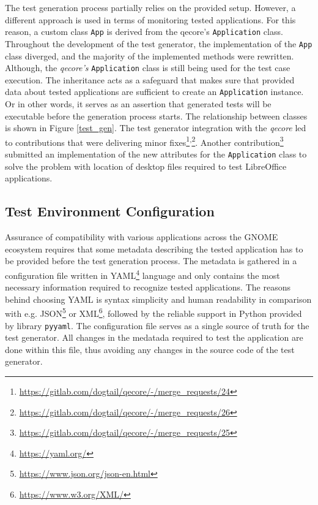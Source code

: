 The test generation process partially relies on the provided setup. However, a different approach is used in terms of monitoring tested applications. For this reason, a custom class \texttt{App} is derived from the qecore's \texttt{Application} class. Throughout the development of the test generator, the implementation of the \texttt{App} class diverged, and the majority of the implemented methods were rewritten. Although, the \textit{qecore's} \texttt{Application} class is still being used for the test case execution. The inheritance acts as a safeguard that makes sure that provided data about tested applications are sufficient to create an \texttt{Application} instance. Or in other words, it serves as an assertion that generated tests will be executable before the generation process starts. The relationship between classes is shown in Figure \ref{test_gen}. The test generator integration with the \textit{qecore} led to contributions that were delivering minor fixes\footnote{\url{https://gitlab.com/dogtail/qecore/-/merge_requests/24}}\textsuperscript{,}\footnote{\url{https://gitlab.com/dogtail/qecore/-/merge_requests/26}}. Another contribution\footnote{\url{https://gitlab.com/dogtail/qecore/-/merge_requests/25}} submitted an implementation of the new attributes for the \texttt{Application} class to solve the problem with location of desktop files required to test LibreOffice applications.

\subsection{Test Environment Configuration}\label{env_config}
Assurance of compatibility with various applications across the GNOME ecosystem requires that some metadata describing the tested application has to be provided before the test generation process. The metadata is gathered in a configuration file written in YAML\footnote{\url{https://yaml.org/}} language and only contains the most necessary information required to recognize tested applications. The reasons behind choosing YAML is syntax simplicity and human readability in comparison with e.g. JSON\footnote{\url{https://www.json.org/json-en.html}} or XML\footnote{\url{https://www.w3.org/XML/}}, followed by the reliable support in Python provided by library \texttt{pyyaml}.\cite{yaml} The  configuration file serves as a single source of truth for the test generator. All changes in the medatada required to test the application are done within this file, thus avoiding any changes in the source code of the test generator.

